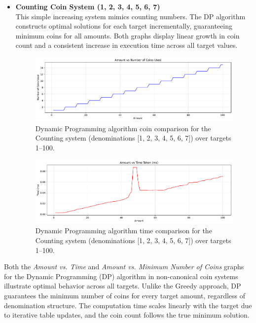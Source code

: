\documentclass[12pt,a4paper]{report}
\begin{document}
\begin{itemize}
  \item \textbf{Counting Coin System (1, 2, 3, 4, 5, 6, 7)}\\
  This simple increasing system mimics counting numbers. The DP algorithm constructs optimal solutions for each target incrementally, guaranteeing minimum coins for all amounts. Both graphs display linear growth in coin count and a consistent increase in execution time across all target values.\\
  \begin{figure}[H]
    \centering
    \includegraphics[width=\textwidth]{graphs/dp_coins_counting_plot.pdf}
    \caption{Dynamic Programming algorithm coin comparison for the Counting system (denominations [1, 2, 3, 4, 5, 6, 7]) over targets 1--100.}
    \label{fig:dp_coins_counting_plot}
  \end{figure}

  \begin{figure}[H]
    \centering
    \includegraphics[width=\textwidth]{graphs/dp_time_counting_plot.pdf}
    \caption{Dynamic Programming algorithm time comparison for the Counting system (denominations [1, 2, 3, 4, 5, 6, 7]) over targets 1--100.}
    \label{fig:dp_time_counting_plot}
  \end{figure}
\end{itemize}

Both the \textit{Amount vs. Time} and \textit{Amount vs. Minimum Number of Coins} graphs for the Dynamic Programming (DP) algorithm in non-canonical coin systems illustrate optimal behavior across all targets. Unlike the Greedy approach, DP guarantees the minimum number of coins for every target amount, regardless of denomination structure. The computation time scales linearly with the target due to iterative table updates, and the coin count follows the true minimum solution.
\end{document}
